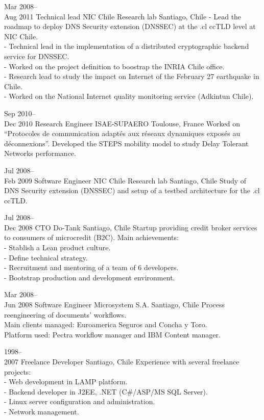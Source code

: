 \documentclass[10pt,a4paper,sans]{moderncv}
\begin{document}
\cventry
{Mar 2008--\\Aug 2011}
{Technical lead}
{NIC Chile Research lab}
{Santiago, Chile}
{}
{
- Lead the roadmap to deploy DNS Security extension (DNSSEC) at the .cl ccTLD level at NIC Chile.\\
- Technical lead in the implementation of a distributed cryptographic backend service for DNSSEC.\\
- Worked on the project definition to boostrap the INRIA Chile office.\\
- Research lead to study the impact on Internet of the February 27 earthquake in Chile.\\
- Worked on the National Internet quality monitoring service (Adkintun Chile).
}

\cventry
{Sep 2010--\\Dec 2010}
{Research Engineer}
{ISAE-SUPAERO}
{Toulouse, France}
{}
{
Worked on ``Protocoles de communication adaptés aux réseaux dynamiques exposés au déconnexions''. Developed the STEPS mobility model to study Delay Tolerant Networks performance.
}

\cventry
{Jul 2008--\\Feb 2009}
{Software Engineer}
{NIC Chile Research lab}
{Santiago, Chile}
{}
{Study of DNS Security extension (DNSSEC) and setup of a testbed architecture for the .cl ccTLD.}

\cventry
{Jul 2008--\\Dec 2008}
{CTO}
{Do-Tank}
{Santiago, Chile}
{}
{
Startup providing credit broker services to consumers of microcredit (B2C). Main achievements:\\
- Stablish a Lean product culture.\\
- Define technical strategy.\\
- Recruitment and mentoring of a team of 6 developers.\\
- Bootstrap production and development environment.\\
}

\cventry
{Mar 2008--\\Jun 2008}
{Software Engineer}
{Microsystem S.A.}
{Santiago, Chile}
{}
{
Process reengineering of documents' workflows.\\
Main clients managed: Euroamerica Seguros and Concha y Toro. \\
Platform used: Pectra workflow manager and IBM Content manager.\\
}


\cventry
{1998--\\2007}
{Freelance Developer}
{}
{Santiago, Chile}
{}
{
Experience with several freelance projects:\\
- Web development in LAMP platform.\\
- Backend developer in J2EE, .NET (C\#/ASP/MS SQL Server).\\
- Linux server configuration and administration.\\
- Network management.\\
}
\end{document}
